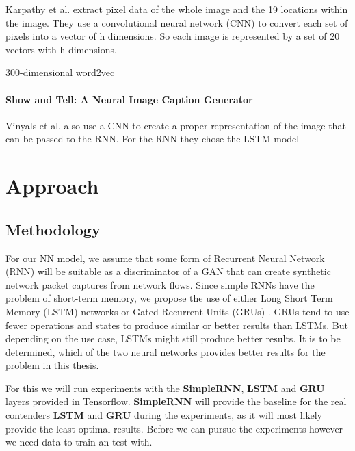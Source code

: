 \documentclass[
	ngerman,
	ruledheaders=section,%
	class=report,%
	thesis={type=bachelor},%
	accentcolor=9c,%
	custommargins=true,%
	marginpar=false,%
	parskip=half-,%
	fontsize=11pt,%
]{tudapub}
\begin{document}
Karpathy et al. extract pixel data of the whole image and the 19 locations within the image.
They use a convolutional neural network (CNN) to convert each set of pixels into a vector of h dimensions.
So each image is represented by a set of 20 vectors with h dimensions.

300-dimensional word2vec

\subsubsection{Show and Tell: A Neural Image Caption Generator} %

Vinyals et al. also use a CNN to create a proper representation of the image that can be passed to the RNN.
For the RNN they chose the LSTM model


\chapter{Approach}

\section{Methodology}

For our NN model, we assume that some form of Recurrent Neural Network (RNN) will be suitable as a discriminator of a GAN that can create synthetic network packet captures from network flows.
Since simple RNNs have the problem of short-term memory, we propose the use of either Long Short Term Memory (LSTM) networks \cite{hochreiterLongShortTermMemory1997} or Gated Recurrent Units (GRUs) \cite{bahdanauNeuralMachineTranslation2016}.
GRUs tend to use fewer operations and states to produce similar or better results than LSTMs.
But depending on the use case, LSTMs might still produce better results.
It is to be determined, which of the two neural networks provides better results for the problem in this thesis.

For this we will run experiments with the \textbf{SimpleRNN}, \textbf{LSTM} and \textbf{GRU} layers provided in Tensorflow.
\textbf{SimpleRNN} will provide the baseline for the real contenders \textbf{LSTM} and \textbf{GRU} during the experiments, as it will most likely provide the least optimal results.
Before we can pursue the experiments however we need data to train an test with.
\end{document}
